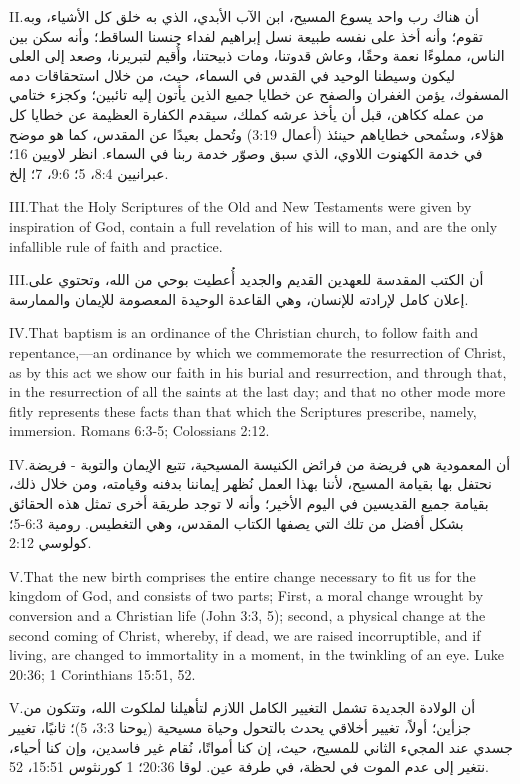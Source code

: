\lettrine{II.} أن هناك رب واحد يسوع المسيح، ابن الآب الأبدي، الذي به خلق كل الأشياء، وبه تقوم؛ وأنه أخذ على نفسه طبيعة نسل إبراهيم لفداء جنسنا الساقط؛ وأنه سكن بين الناس، مملوءًا نعمة وحقًا، وعاش قدوتنا، ومات ذبيحتنا، وأُقيم لتبريرنا، وصعد إلى العلى ليكون وسيطنا الوحيد في القدس في السماء، حيث، من خلال استحقاقات دمه المسفوك، يؤمن الغفران والصفح عن خطايا جميع الذين يأتون إليه تائبين؛ وكجزء ختامي من عمله ككاهن، قبل أن يأخذ عرشه كملك، سيقدم الكفارة العظيمة عن خطايا كل هؤلاء، وستُمحى خطاياهم حينئذ (أعمال 3:19) وتُحمل بعيدًا عن المقدس، كما هو موضح في خدمة الكهنوت اللاوي، الذي سبق وصوّر خدمة ربنا في السماء. انظر لاويين 16؛ عبرانيين 8:4، 5؛ 9:6، 7؛ إلخ.


\lettrine{III.} That the Holy Scriptures of the Old and New Testaments were given by inspiration of God, contain a full revelation of his will to man, and are the only infallible rule of faith and practice.


\lettrine{III.} أن الكتب المقدسة للعهدين القديم والجديد أُعطيت بوحي من الله، وتحتوي على إعلان كامل لإرادته للإنسان، وهي القاعدة الوحيدة المعصومة للإيمان والممارسة.


\lettrine{IV.} That baptism is an ordinance of the Christian church, to follow faith and repentance,—an ordinance by which we commemorate the resurrection of Christ, as by this act we show our faith in his burial and resurrection, and through that, in the resurrection of all the saints at the last day; and that no other mode more fitly represents these facts than that which the Scriptures prescribe, namely, immersion. Romans 6:3-5; Colossians 2:12.


\lettrine{IV.} أن المعمودية هي فريضة من فرائض الكنيسة المسيحية، تتبع الإيمان والتوبة - فريضة نحتفل بها بقيامة المسيح، لأننا بهذا العمل نُظهر إيماننا بدفنه وقيامته، ومن خلال ذلك، بقيامة جميع القديسين في اليوم الأخير؛ وأنه لا توجد طريقة أخرى تمثل هذه الحقائق بشكل أفضل من تلك التي يصفها الكتاب المقدس، وهي التغطيس. رومية 6:3-5؛ كولوسي 2:12.


\lettrine{V.} That the new birth comprises the entire change necessary to fit us for the kingdom of God, and consists of two parts; First, a moral change wrought by conversion and a Christian life (John 3:3, 5); second, a physical change at the second coming of Christ, whereby, if dead, we are raised incorruptible, and if living, are changed to immortality in a moment, in the twinkling of an eye. Luke 20:36; 1 Corinthians 15:51, 52.


\lettrine{V.} أن الولادة الجديدة تشمل التغيير الكامل اللازم لتأهيلنا لملكوت الله، وتتكون من جزأين؛ أولاً، تغيير أخلاقي يحدث بالتحول وحياة مسيحية (يوحنا 3:3، 5)؛ ثانيًا، تغيير جسدي عند المجيء الثاني للمسيح، حيث، إن كنا أمواتًا، نُقام غير فاسدين، وإن كنا أحياء، نتغير إلى عدم الموت في لحظة، في طرفة عين. لوقا 20:36؛ 1 كورنثوس 15:51، 52.


